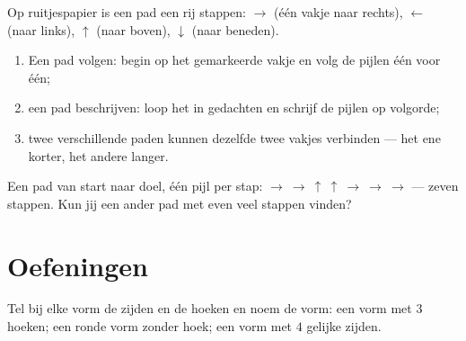 \begin{method}\label{met:g1:shapes:path}
Op ruitjespapier is een pad een rij stappen:
$\to$ (één vakje naar rechts), $\leftarrow$ (naar links), $\uparrow$
(naar boven), $\downarrow$ (naar beneden).
\begin{enumerate}
  \item Een pad volgen: begin op het gemarkeerde vakje en volg de
        pijlen één voor één;
  \item een pad beschrijven: loop het in gedachten en schrijf de
        pijlen op volgorde;
  \item twee verschillende paden kunnen dezelfde twee vakjes
        verbinden --- het ene korter, het andere langer.
\end{enumerate}
\end{method}

\begin{omfigure}

{\small Een pad van start naar doel, één pijl per stap:
$\to\ \to\ \uparrow\ \uparrow\ \to\ \to\ \to$ --- zeven stappen. Kun
jij een ander pad met even veel stappen vinden?}
\end{omfigure}

\section{Oefeningen}

\begin{exercise}[$\star$]\label{exo:g1:shapes:1}
Tel bij elke vorm de zijden en de hoeken en noem de vorm: een vorm met
$3$ hoeken; een ronde vorm zonder hoek; een vorm met $4$ gelijke
zijden.
\end{exercise}

